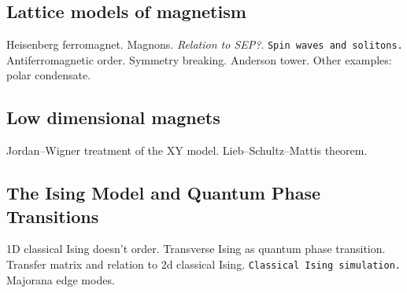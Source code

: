 \subsection{Lattice models of magnetism}

Heisenberg ferromagnet. Magnons. \textit{Relation to SEP?}. \verb|Spin waves and solitons.|
Antiferromagnetic order. Symmetry breaking. Anderson tower. Other examples: polar condensate.

\subsection{Low dimensional magnets}

Jordan--Wigner treatment of the XY model. Lieb--Schultz--Mattis theorem.

\subsection{The Ising Model and Quantum Phase Transitions}

1D classical Ising doesn't order. Transverse Ising as quantum phase transition. Transfer matrix and relation to 2d classical Ising. \verb|Classical Ising simulation.| Majorana edge modes.








